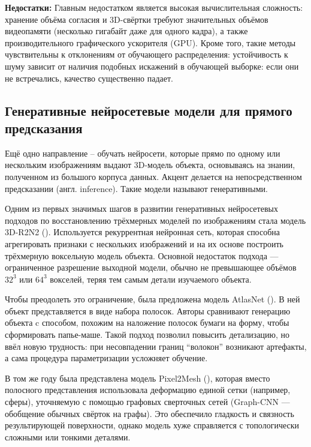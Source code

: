 \textbf{Недостатки:}
Главным недостатком является высокая вычислительная сложность: хранение объёма
согласия и 3D-свёртки требуют значительных объёмов видеопамяти (несколько
гигабайт даже для одного кадра), а также производительного графического
ускорителя (GPU). Кроме того, такие методы чувствительны к отклонениям от
обучающего распределения: устойчивость к шуму зависит от наличия подобных
искажений в обучающей выборке: если они не встречались, качество существенно
падает.

\subsection{Генеративные нейросетевые модели для прямого предсказания}

Ещё одно направление – обучать нейросети, которые прямо по одному или нескольким
изображениям выдают 3D-модель объекта, основываясь на знании, полученном из
большого корпуса данных. Акцент делается на непосредственном предсказании (англ.
inference). Такие модели называют генеративными.

Одним из первых значимых шагов в развитии генеративных нейросетевых подходов по
восстановлению трёхмерных моделей по изображениям стала модель 3D-R2N2
(\cite{choy20163dr2n2unifiedapproachsingle}). Используется рекуррентная
нейронная сеть, которая способна агрегировать признаки с нескольких изображений
и на их основе построить трёхмерную воксельную модель объекта. Основной
недостаток подхода — ограниченное разрешение выходной модели, обычно не
превышающее объёмов \(32^3\) или \(64^3\) вокселей, теряя тем самым детали
изучаемого объекта.

Чтобы преодолеть это ограничение, была предложена модель AtlasNet
(\cite{groueix2018atlasnetpapiermacheapproachlearning}). В ней объект
представляется в виде набора полосок. Авторы сравнивают генерацию объекта c
способом, похожим на наложение полосок бумаги на форму, чтобы сформировать
папье-маше. Такой подход позволил повысить детализацию, но ввёл новую
трудность: при несовпадении границ ``волокон'' возникают артефакты, а сама процедура
параметризации усложняет обучение.

В том же году была представлена модель Pixel2Mesh
(\cite{wang2018pixel2meshgenerating3dmesh}), которая вместо полосного
представления использовала деформацию единой сетки (например, сферы), уточняемую
с помощью графовых сверточных сетей (Graph-CNN — обобщение обычных свёрток на
графы). Это обеспечило гладкость и связность результирующей поверхности, однако
модель хуже справляется с топологически сложными или тонкими деталями.

